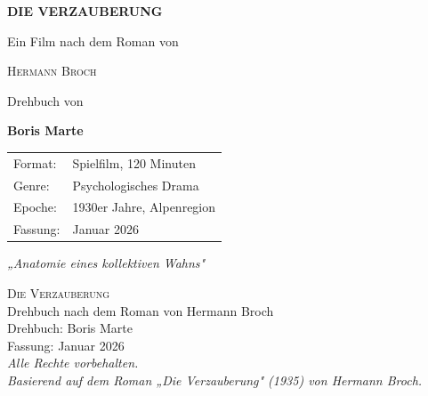 \documentclass[11pt,a4paper,twoside]{book}
\begin{document}

\begin{titlepage}
    \centering
    \vspace*{3cm}

    {\Huge\bfseries\color{darkgray} DIE VERZAUBERUNG}

    \vspace{1cm}

    {\Large Ein Film nach dem Roman von}

    \vspace{0.5cm}

    {\LARGE\textsc{Hermann Broch}}

    \vspace{3cm}

    {\large Drehbuch von}

    \vspace{0.5cm}

    {\Large\bfseries Boris Marte}

    \vfill

    \begin{tabular}{ll}
        Format: & Spielfilm, 120 Minuten \\
        Genre: & Psychologisches Drama \\
        Epoche: & 1930er Jahre, Alpenregion \\
        Fassung: & Januar 2026
    \end{tabular}

    \vspace{2cm}

    {\small\textit{„Anatomie eines kollektiven Wahns"}}

\end{titlepage}


\thispagestyle{empty}
\vspace*{\fill}

\begin{center}
\textsc{Die Verzauberung}\\[0.5em]
Drehbuch nach dem Roman von Hermann Broch\\[2em]

Drehbuch: Boris Marte\\[0.5em]
Fassung: Januar 2026\\[2em]

\textit{Alle Rechte vorbehalten.}\\
\textit{Basierend auf dem Roman „Die Verzauberung" (1935) von Hermann Broch.}
\end{center}
\end{document}
